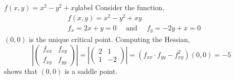 \begin{ex}{$f(x, y)=x^2-y^2+x y$}{label}
Consider the function,
\begin{align*}
&f(x, y)=x^2-y^2+x y \\
&f_x=2 x+y=0 \quad \text{ and } \quad f_y=-2 y+x=0
\end{align*}
$(0,0)$ is the unique critical point. Computing the Hessian,
\[\left|\left(\begin{array}{ll}
f_{x x} & f_{x y} \\
f_{x y} & f_{y y}
\end{array}\right)\right|=\left|\left(\begin{array}{cc}
2 & 1 \\
1 & -2
\end{array}\right)\right|=\left(f_{x x} \cdot f_{y y}-f_{x y}^2\right)(0,0)=-5\]
shows that $(0,0)$ is a saddle point.
\end{ex}

